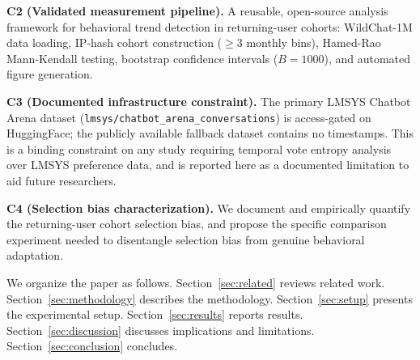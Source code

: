 \textbf{C2 (Validated measurement pipeline).} A reusable, open-source analysis framework for behavioral trend detection in returning-user cohorts: WildChat-1M data loading, IP-hash cohort construction ($\geq$3 monthly bins), Hamed-Rao Mann-Kendall testing, bootstrap confidence intervals ($B = 1000$), and automated figure generation.

\textbf{C3 (Documented infrastructure constraint).} The primary LMSYS Chatbot Arena dataset (\texttt{lmsys/chatbot\_arena\_conversations}) is access-gated on HuggingFace; the publicly available fallback dataset contains no timestamps. This is a binding constraint on any study requiring temporal vote entropy analysis over LMSYS preference data, and is reported here as a documented limitation to aid future researchers.

\textbf{C4 (Selection bias characterization).} We document and empirically quantify the returning-user cohort selection bias, and propose the specific comparison experiment needed to disentangle selection bias from genuine behavioral adaptation.

We organize the paper as follows. Section~\ref{sec:related} reviews related work. Section~\ref{sec:methodology} describes the methodology. Section~\ref{sec:setup} presents the experimental setup. Section~\ref{sec:results} reports results. Section~\ref{sec:discussion} discusses implications and limitations. Section~\ref{sec:conclusion} concludes.
